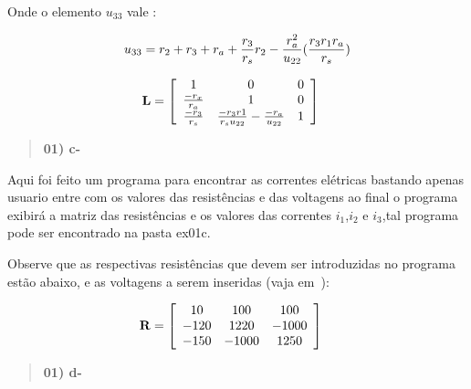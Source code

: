 \documentclass[a4wide]{report}
\begin{document}
Onde o elemento $u_{3 3}$ vale : 

\begin{large}
\begin{equation}
\centering
u_{3 3} = r_{2} + r_{3} + r_{a} + \frac{r_{3}}{r_{s}}r_{2} - \frac{r_{a}^{2}}{u_{22}}(\frac{r_{3}r_{1}r_{a}}{r_{s}})
\end{equation}
\end{large}


\begin{Large}
\begin{equation} %
\centering
\bf L=\left[\begin{array}{ccc}
1 & 0 & 0 \\
\frac{-r_{x}}{r_{a}} & 1 & 0 \\
\frac{-r_{3}}{r_{s}} & \frac{-r_{3}r{1}}{r_{s}u_{22}} -\frac{-r_{a}}{u_{22}} & 1
\end{array}\right]\quad
\label{matrizU}
\end{equation}
\end{Large}

\begin{quote}

\bf 01) c- 

\end{quote}

Aqui foi feito um programa para encontrar as correntes elétricas bastando apenas usuario entre 
com os valores das resistências e das voltagens ao final o programa exibirá a matriz das resistências 
e os valores das correntes $i_1$,$i_2$ e $i_3$,tal programa pode ser encontrado na pasta ex01c.

Observe que as respectivas resistências que devem ser introduzidas no programa estão abaixo, 
e as voltagens a serem inseridas (vaja em~\cite{roteiro}):


\begin{equation} %
\bf R=\left[\begin{array}{ccc}
10 & 100 & 100 \\
-120 & 1220 & -1000 \\
-150 & -1000 & 1250
\end{array}\right]\quad
\label{matrizR}
\end{equation}




\begin{quote}

\bf 01) d- 

\end{quote}
\end{document}
